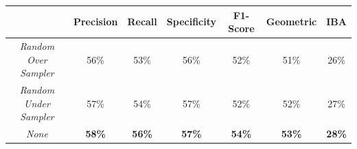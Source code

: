 \begin{table}[H]
	\centering
	\begin{tabular}{ccccccc}
		\hline
		& \textbf{Precision} & \textbf{Recall} & \textbf{Specificity} & \textbf{F1-Score} & \textbf{Geometric} & \textbf{IBA}  \\ \hline
		\textit{Random Over Sampler}  & 56\%               & 53\%            & 56\%                 & 52\%              & 51\%               & 26\%          \\
		\textit{Random Under Sampler} & 57\%               & 54\%            & 57\%                 & 52\%              & 52\%               & 27\%          \\
		\textit{None}                 & \textbf{58\%}      & \textbf{56\%}   & \textbf{57\%}        & \textbf{54\%}     & \textbf{53\%}      & \textbf{28\%}
	\end{tabular}
\end{table}



